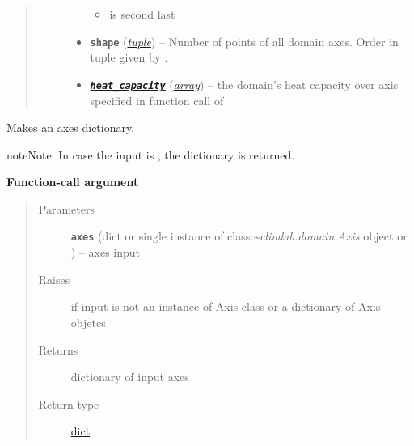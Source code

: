 \documentclass[letterpaper,10pt,english]{sphinxmanual}
\begin{document}
\begin{fulllineitems}
\begin{quote}
\begin{description}
\begin{itemize}
\begin{itemize}
\item {} 
 is second last

\end{itemize}


\item {} 
\textbf{\texttt{shape}} (\href{http://docs.python.org/2.7/library/functions.html\#tuple}{\emph{tuple}}) -- Number of points of all domain axes. Order in 
tuple given by .

\item {} 
{\hyperref[api/climlab.utils:module-climlab.utils.heat_capacity]{\emph{\textbf{\texttt{heat\_capacity}}}}} (\href{http://docs.python.org/2.7/library/array.html\#module-array}{\emph{array}}) -- the domain's heat capacity over axis specified 
in function call of {\hyperref[api/climlab.domain:climlab.domain.domain._Domain.set_heat_capacity]{\emph{}}}

\end{itemize}

\end{description}\end{quote}

\begin{fulllineitems}
\label{api/climlab.domain:climlab.domain.domain._Domain._make_axes_dict}
Makes an axes dictionary.

\begin{notice}{note}{Note:}
In case the input is , the dictionary 
is returned.
\end{notice}

\textbf{Function-call argument}
\begin{quote}\begin{description}
\item[{Parameters}] \leavevmode
\textbf{\texttt{axes}} (dict or single instance of class:\emph{\textasciitilde{}climlab.domain.Axis} object
or ) -- axes input

\item[{Raises}] \leavevmode
{}  if input is not an instance of Axis class 
or a dictionary of Axis objetcs

\item[{Returns}] \leavevmode
dictionary of input axes

\item[{Return type}] \leavevmode
\href{http://docs.python.org/2.7/library/stdtypes.html\#dict}{dict}


\end{description}
\end{quote}
\end{fulllineitems}
\end{fulllineitems}
\end{document}
